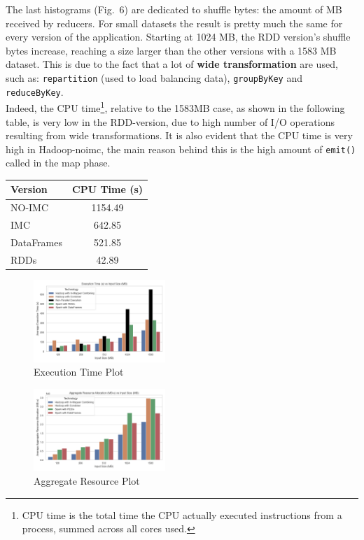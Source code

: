 The last histograms (Fig.~6) are dedicated to shuffle bytes: the amount of MB received by reducers. For small datasets the result is pretty much the same for every version of the application. Starting at 1024 MB, the RDD version's shuffle bytes increase, reaching a size larger than the other versions with a 1583 MB dataset. This is due to the fact that a lot of \textbf{wide transformation} are used, such as: \texttt{repartition} (used to load balancing data), \texttt{groupByKey} and \texttt{reduceByKey}.\\
Indeed, the CPU time\footnote{CPU time is the total time the CPU actually executed instructions from a process, summed across all cores used.}, relative to the 1583MB case, as shown in the following table, is very low in the RDD-version, due to high number of I/O operations resulting from wide transformations. It is also evident that the CPU time is very high in Hadoop-noimc, the main reason behind this is the high amount of \texttt{emit()} called in the map phase.
\begin{table}[H]
	\centering
	\begin{tabular}{lc}
		\hline
		\textbf{Version} & \textbf{CPU Time (s)} \\
		\hline
		NO-IMC    & 1154.49 \\
		IMC  & 642.85 \\
		DataFrames & 521.85 \\
		RDDs       & 42.89 \\
		\hline
	\end{tabular}
	\label{tab:avg-cpu-time}
\end{table}
\begin{figure}[H]
	\centering
	\includegraphics[width=0.444\textwidth]{images/Fig_Execution_Time.png}
	\caption{Execution Time Plot}
	\label{fig:execution-time}
\end{figure}
\begin{figure}[H]
	\centering
	\includegraphics[width=0.444\textwidth]{images/Fig_Aggregate_Resource_Allocation.png}
	\caption{Aggregate Resource Plot}
	\label{fig:aggregate-resource-allocation}
\end{figure}
